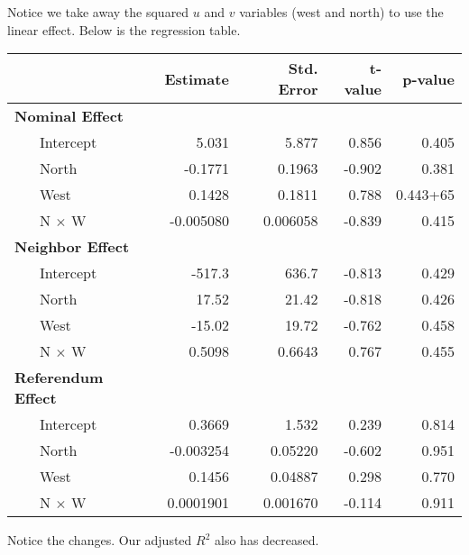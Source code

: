 \begin{enumerate}
\begin{solution}
Notice we take away the squared $u$ and $v$ variables (west and north) to use the linear effect. Below is the regression table.
\begin{center}
\begin{table}[t]\centering
\begin{tabular}{llrrrr}
\phantom{X} & & Estimate & Std. Error & t-value & p-value \\
\midrule
\multicolumn{2}{l}{\textbf{Nominal Effect}} \\
 & Intercept    & 5.031 & 5.877 &  0.856 & 0.405 \\
 & North        &  -0.1771 &  0.1963 & -0.902 & 0.381 \\
 & West         &  0.1428 &  0.1811 &  0.788 & 0.443+65 \\
 & N $\times$ W &  -0.005080 &   0.006058 & -0.839 & 0.415\\
%
\midrule
%
\multicolumn{2}{l}{\textbf{Neighbor Effect}} \\
 & Intercept    & -517.3\phantom{000} & 636.7\phantom{000} & -0.813 & 0.429 \\
 & North        & 17.52\phantom{00}  & 21.42\phantom{00}  & -0.818 & 0.426 \\
 & West         &  -15.02\phantom{00}  & 19.72\phantom{00}  &  -0.762 & 0.458 \\
 & N $\times$ W &  0.5098            & 0.6643             &  0.767 & 0.455 \\
%
\midrule
%
\multicolumn{2}{l}{\textbf{Referendum Effect}} \\
 & Intercept    & 0.3669 & 1.532 & 0.239 & 0.814 \\
 & North        & -0.003254 & 0.05220 & -0.602 & 0.951 \\
 & West         & 0.1456 & 0.04887 & 0.298 & 0.770 \\
 & N $\times$ W &  0.0001901 & 0.001670 &  -0.114 & 0.911 \\
%
\end{tabular}
\end{table}
\end{center}

Notice the changes. Our adjusted $R^{2}$ also has decreased.
\end{solution}
\end{enumerate}

